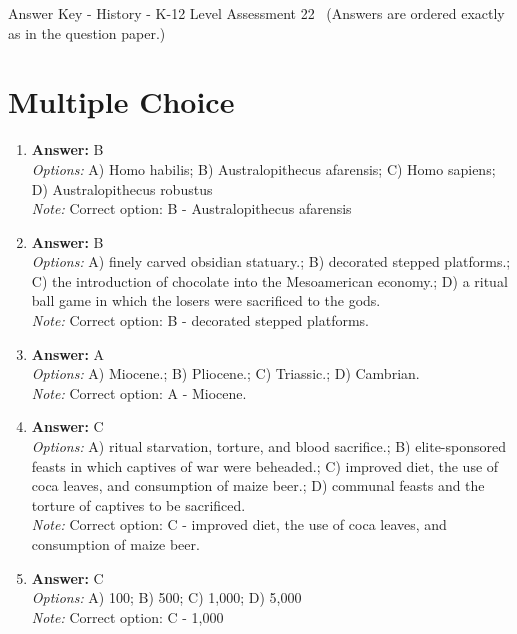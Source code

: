\documentclass[12pt]{article}
\begin{document}
\begin{center}
Answer Key - History - K-12 Level Assessment 22 \
\small (Answers are ordered exactly as in the question paper.)
\end{center}

\section*{Multiple Choice}
\begin{enumerate}[label=\arabic*.]
\item \textbf{Answer:} B
\\ \textit{Options:} A) Homo habilis; B) Australopithecus afarensis; C) Homo sapiens; D) Australopithecus robustus
\\ \textit{Note:} Correct option: B - Australopithecus afarensis
\item \textbf{Answer:} B
\\ \textit{Options:} A) finely carved obsidian statuary.; B) decorated stepped platforms.; C) the introduction of chocolate into the Mesoamerican economy.; D) a ritual ball game in which the losers were sacrificed to the gods.
\\ \textit{Note:} Correct option: B - decorated stepped platforms.
\item \textbf{Answer:} A
\\ \textit{Options:} A) Miocene.; B) Pliocene.; C) Triassic.; D) Cambrian.
\\ \textit{Note:} Correct option: A - Miocene.
\item \textbf{Answer:} C
\\ \textit{Options:} A) ritual starvation, torture, and blood sacrifice.; B) elite-sponsored feasts in which captives of war were beheaded.; C) improved diet, the use of coca leaves, and consumption of maize beer.; D) communal feasts and the torture of captives to be sacrificed.
\\ \textit{Note:} Correct option: C - improved diet, the use of coca leaves, and consumption of maize beer.
\item \textbf{Answer:} C
\\ \textit{Options:} A) 100; B) 500; C) 1,000; D) 5,000
\\ \textit{Note:} Correct option: C - 1,000
\end{enumerate}
\end{document}
